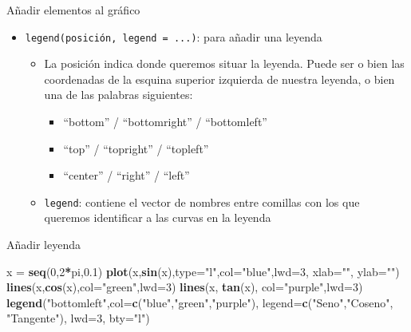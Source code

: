 \documentclass[
  ignorenonframetext,
  aspectratio=169]{beamer}
\newenvironment{Shaded}{\begin{snugshade}}{\end{snugshade}}
\newcommand{\AttributeTok}[1]{\textcolor[rgb]{0.13,0.29,0.53}{#1}}
\newcommand{\DecValTok}[1]{\textcolor[rgb]{0.00,0.00,0.81}{#1}}
\newcommand{\FloatTok}[1]{\textcolor[rgb]{0.00,0.00,0.81}{#1}}
\newcommand{\FunctionTok}[1]{\textcolor[rgb]{0.13,0.29,0.53}{\textbf{#1}}}
\newcommand{\NormalTok}[1]{#1}
\newcommand{\OtherTok}[1]{\textcolor[rgb]{0.56,0.35,0.01}{#1}}
\newcommand{\SpecialCharTok}[1]{\textcolor[rgb]{0.81,0.36,0.00}{\textbf{#1}}}
\newcommand{\StringTok}[1]{\textcolor[rgb]{0.31,0.60,0.02}{#1}}
\providecommand{\tightlist}{%
  \setlength{\itemsep}{0pt}\setlength{\parskip}{0pt}}
\begin{document}
\begin{frame}[fragile]{Añadir elementos al gráfico}
\label{auxf1adir-elementos-al-gruxe1fico-3}
\begin{itemize}
\tightlist
\item
  \texttt{legend(posición,\ legend\ =\ ...)}: para añadir una leyenda

  \begin{itemize}
  \tightlist
  \item
    La posición indica donde queremos situar la leyenda. Puede ser o
    bien las coordenadas de la esquina superior izquierda de nuestra
    leyenda, o bien una de las palabras siguientes:

    \begin{itemize}
    \tightlist
    \item
      ``bottom'' / ``bottomright'' / ``bottomleft''
    \item
      ``top'' / ``topright'' / ``topleft''
    \item
      ``center'' / ``right'' / ``left''
    \end{itemize}
  \item
    \texttt{legend}: contiene el vector de nombres entre comillas con
    los que queremos identificar a las curvas en la leyenda
  \end{itemize}
\end{itemize}
\end{frame}

\begin{frame}[fragile]{Añadir leyenda}
\label{auxf1adir-leyenda}
\begin{Shaded}
\begin{Highlighting}[]
\NormalTok{x }\OtherTok{=} \FunctionTok{seq}\NormalTok{(}\DecValTok{0}\NormalTok{,}\DecValTok{2}\SpecialCharTok{*}\NormalTok{pi,}\FloatTok{0.1}\NormalTok{)}
\FunctionTok{plot}\NormalTok{(x,}\FunctionTok{sin}\NormalTok{(x),}\AttributeTok{type=}\StringTok{"l"}\NormalTok{,}\AttributeTok{col=}\StringTok{"blue"}\NormalTok{,}\AttributeTok{lwd=}\DecValTok{3}\NormalTok{, }\AttributeTok{xlab=}\StringTok{""}\NormalTok{, }\AttributeTok{ylab=}\StringTok{""}\NormalTok{)}
\FunctionTok{lines}\NormalTok{(x,}\FunctionTok{cos}\NormalTok{(x),}\AttributeTok{col=}\StringTok{"green"}\NormalTok{,}\AttributeTok{lwd=}\DecValTok{3}\NormalTok{)}
\FunctionTok{lines}\NormalTok{(x, }\FunctionTok{tan}\NormalTok{(x), }\AttributeTok{col=}\StringTok{"purple"}\NormalTok{,}\AttributeTok{lwd=}\DecValTok{3}\NormalTok{)}
\FunctionTok{legend}\NormalTok{(}\StringTok{"bottomleft"}\NormalTok{,}\AttributeTok{col=}\FunctionTok{c}\NormalTok{(}\StringTok{"blue"}\NormalTok{,}\StringTok{"green"}\NormalTok{,}\StringTok{"purple"}\NormalTok{), }
       \AttributeTok{legend=}\FunctionTok{c}\NormalTok{(}\StringTok{"Seno"}\NormalTok{,}\StringTok{"Coseno"}\NormalTok{, }\StringTok{"Tangente"}\NormalTok{), }
       \AttributeTok{lwd=}\DecValTok{3}\NormalTok{, }\AttributeTok{bty=}\StringTok{"l"}\NormalTok{)}
\end{Highlighting}
\end{Shaded}
\end{frame}
\end{document}
